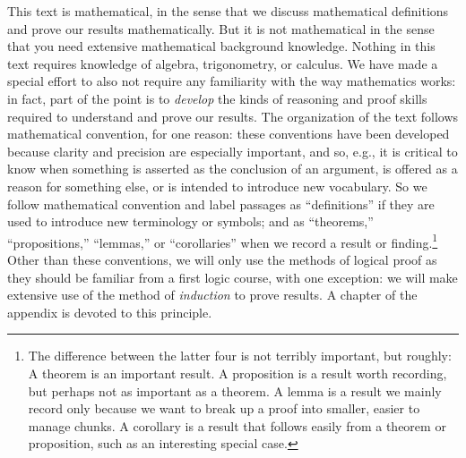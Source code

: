 This text is mathematical, in the sense that we discuss mathematical
definitions and prove our results mathematically.  But it is not
mathematical in the sense that you need extensive mathematical
background knowledge.  Nothing in this text requires
knowledge of algebra, trigonometry, or calculus.  We have made a
special effort to also not require any familiarity with the way
mathematics works: in fact, part of the point is to \emph{develop} the
kinds of reasoning and proof skills required to understand and prove
our results.  The organization of the text follows mathematical
convention, for one reason: these conventions have been developed
because clarity and precision are especially important, and so, e.g.,
it is critical to know when something is asserted as the conclusion of
an argument, is offered as a reason for something else, or is intended
to introduce new vocabulary. So we follow mathematical convention and
label passages as ``definitions'' if they are used to introduce new
terminology or symbols; and as ``theorems,'' ``propositions,''
``lemmas,'' or ``corollaries'' when we record a result or
finding.\footnote{The difference between the latter four is not
  terribly important, but roughly: A theorem is an important result. A
  proposition is a result worth recording, but perhaps not as
  important as a theorem. A lemma is a result we mainly record only
  because we want to break up a proof into smaller, easier to manage
  chunks.  A corollary is a result that follows easily from a theorem
  or proposition, such as an interesting special case.}  Other than
these conventions, we will only use the methods of logical proof as
they should be familiar from a first logic course, with one exception:
we will make extensive use of the method of \emph{induction} to prove
results.  A chapter of the appendix is devoted to this principle.

